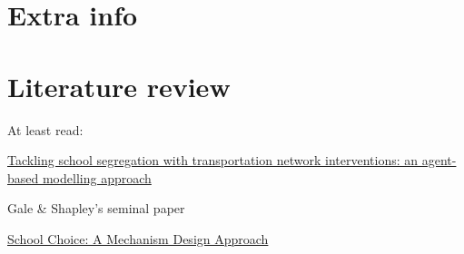 \documentclass{article}
\begin{document}
\section{Extra info}

\section{Literature review}
At least read:

\href{https://doi.org/10.1007/s10458-024-09652-x}{Tackling school segregation with transportation network interventions: an agent-based modelling approach}

Gale \& Shapley's seminal paper

\href{https://doi.org/10.1257/000282803322157061}{School Choice: A Mechanism Design Approach}
\end{document}
